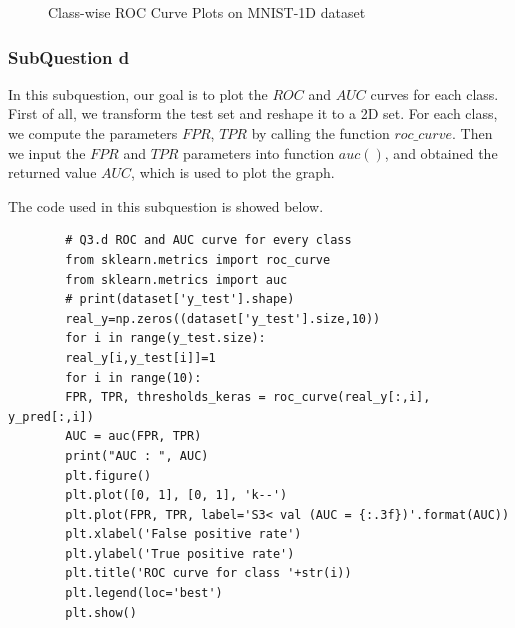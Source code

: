 \documentclass[conference]{IEEEtran}
\begin{document}
\begin{figure}[t]
		
		\caption{Class-wise ROC Curve Plots on MNIST-1D dataset}
		\label{Fig.ba}
	\end{figure}

	\subsubsection{SubQuestion d}
	In this subquestion, our goal is to plot the $ROC$ and $AUC$ curves for each class. First of all, we transform the test set and reshape it to a 2D set. For each class, we compute the parameters $FPR$, $TPR$ by calling the function $roc\_curve$. Then we input the $FPR$ and $TPR$ parameters into function $auc()$, and obtained the returned value $AUC$, which is used to plot the graph.\par
	The code used in this subquestion is showed below.
	\begin{lstlisting}
		# Q3.d ROC and AUC curve for every class
		from sklearn.metrics import roc_curve
		from sklearn.metrics import auc
		# print(dataset['y_test'].shape)
		real_y=np.zeros((dataset['y_test'].size,10))
		for i in range(y_test.size):
		real_y[i,y_test[i]]=1
		for i in range(10):
		FPR, TPR, thresholds_keras = roc_curve(real_y[:,i], y_pred[:,i])   
		AUC = auc(FPR, TPR)
		print("AUC : ", AUC)
		plt.figure()
		plt.plot([0, 1], [0, 1], 'k--')
		plt.plot(FPR, TPR, label='S3< val (AUC = {:.3f})'.format(AUC))
		plt.xlabel('False positive rate')
		plt.ylabel('True positive rate')
		plt.title('ROC curve for class '+str(i))
		plt.legend(loc='best')
		plt.show()   
	\end{lstlisting}
	
\end{document}
